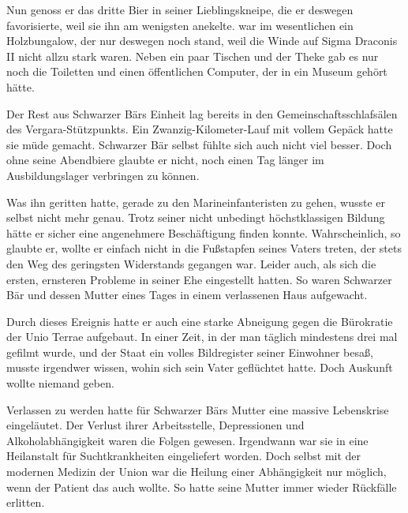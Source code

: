 \par

Nun genoss er das dritte Bier in seiner Lieblingskneipe, die er deswegen favorisierte, weil sie ihn am wenigsten anekelte.  war im wesentlichen ein Holzbungalow, der nur deswegen noch stand, weil die Winde auf Sigma Draconis II nicht allzu stark waren. Neben ein paar Tischen und der Theke gab es nur noch die Toiletten und einen öffentlichen Computer, der in ein Museum gehört hätte.

\par

Der Rest aus Schwarzer Bärs Einheit lag bereits in den Gemeinschaftsschlafsälen des Vergara-Stützpunkts. Ein Zwanzig-Kilometer-Lauf mit vollem Gepäck hatte sie müde gemacht. Schwarzer Bär selbst fühlte sich auch nicht viel besser. Doch ohne seine Abendbiere glaubte er nicht, noch einen Tag länger im Ausbildungslager verbringen zu können.

\par

Was ihn geritten hatte, gerade zu den Marineinfanteristen zu gehen, wusste er selbst nicht mehr genau. Trotz seiner nicht unbedingt höchstklassigen Bildung hätte er sicher eine angenehmere Beschäftigung finden konnte. Wahrscheinlich, so glaubte er, wollte er einfach nicht in die Fußstapfen seines Vaters treten, der stets den Weg des geringsten Widerstands gegangen war. Leider auch, als sich die ersten, ernsteren Probleme in seiner Ehe eingestellt hatten. So waren Schwarzer Bär und dessen Mutter eines Tages in einem verlassenen Haus aufgewacht.

\par

Durch dieses Ereignis hatte er auch eine starke Abneigung gegen die Bürokratie der Unio Terrae aufgebaut. In einer Zeit, in der man täglich mindestens drei mal gefilmt wurde, und der Staat ein volles Bildregister seiner Einwohner besaß, musste irgendwer wissen, wohin sich sein Vater geflüchtet hatte. Doch Auskunft wollte niemand geben.

\par

Verlassen zu werden hatte für Schwarzer Bärs Mutter eine massive Lebenskrise eingeläutet. Der Verlust ihrer Arbeitsstelle, Depressionen und Alkoholabhängigkeit waren die Folgen gewesen. Irgendwann war sie in eine Heilanstalt für Suchtkrankheiten eingeliefert worden. Doch selbst mit der modernen Medizin der Union war die Heilung einer Abhängigkeit nur möglich, wenn der Patient das auch wollte. So hatte seine Mutter immer wieder Rückfälle erlitten.

